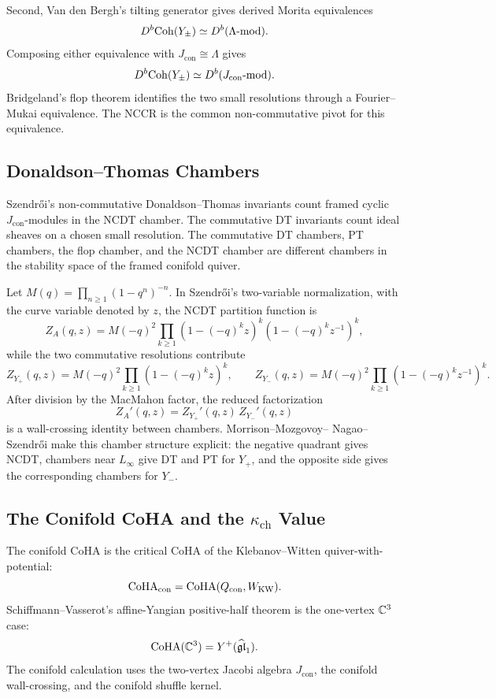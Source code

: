Second, Van den Bergh's tilting generator gives derived Morita
equivalences
\[
  D^{b}\mathrm{Coh}(Y_{\pm})\simeq D^{b}(\Lambda\text{-}\mathrm{mod}).
\]
Composing either equivalence with \(J_{\mathrm{con}}\cong\Lambda\)
gives
\[
  D^{b}\mathrm{Coh}(Y_{\pm})\simeq D^{b}(J_{\mathrm{con}}\text{-}\mathrm{mod}).
\]
Bridgeland's flop theorem identifies the two small resolutions through a
Fourier--Mukai equivalence.  The NCCR is the common non-commutative
pivot for this equivalence.

\subsection*{Donaldson--Thomas Chambers}

Szendr\H{o}i's non-commutative Donaldson--Thomas invariants count
framed cyclic \(J_{\mathrm{con}}\)-modules in the NCDT chamber.  The
commutative DT invariants count ideal sheaves on a chosen small
resolution.  The commutative DT chambers, PT chambers, the flop chamber,
and the NCDT chamber are different chambers in the stability space of
the framed conifold quiver.

Let \(M(q)=\prod_{n\geq 1}(1-q^n)^{-n}\).  In Szendr\H{o}i's
two-variable normalization, with the curve variable denoted by \(z\),
the NCDT partition function is
\[
  Z_A(q,z)=
  M(-q)^2
  \prod_{k\geq 1}(1-(-q)^kz)^k(1-(-q)^kz^{-1})^k,
\]
while the two commutative resolutions contribute
\[
  Z_{Y_+}(q,z)=M(-q)^2\prod_{k\geq 1}(1-(-q)^kz)^k,
  \qquad
  Z_{Y_-}(q,z)=M(-q)^2\prod_{k\geq 1}(1-(-q)^kz^{-1})^k.
\]
After division by the MacMahon factor, the reduced factorization
\[
  Z_A'(q,z)=Z_{Y_+}'(q,z)\,Z_{Y_-}'(q,z)
\]
is a wall-crossing identity between chambers.  Morrison--Mozgovoy--
Nagao--Szendr\H{o}i make this chamber structure explicit: the negative
quadrant gives NCDT, chambers near \(L_\infty\) give DT and PT for
\(Y_+\), and the opposite side gives the corresponding chambers for
\(Y_-\).

\subsection*{The Conifold CoHA and the \texorpdfstring{\(\kappa_{\mathrm{ch}}\)}{chiral invariant} Value}

The conifold CoHA is the critical CoHA of the Klebanov--Witten
quiver-with-potential:
\[
  \mathrm{CoHA}_{\mathrm{con}}=\mathrm{CoHA}(Q_{\mathrm{con}},W_{\mathrm{KW}}).
\]
Schiffmann--Vasserot's affine-Yangian positive-half theorem is the
one-vertex \(\mathbb C^3\) case:
\[
  \mathrm{CoHA}(\mathbb C^3)=Y^+(\widehat{\mathfrak{gl}}_1).
\]
The conifold calculation uses the two-vertex Jacobi algebra
\(J_{\mathrm{con}}\), the conifold wall-crossing, and the conifold
shuffle kernel.

